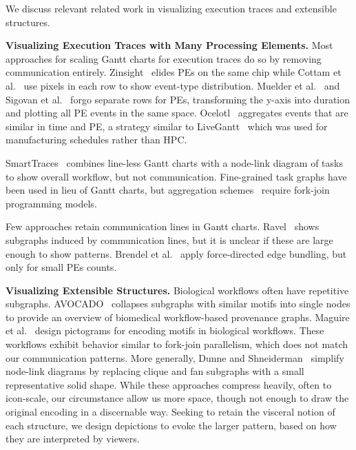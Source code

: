 We discuss relevant related work in visualizing execution traces and extensible structures.

\vspace{1ex}

\textbf{Visualizing Execution Traces with Many Processing Elements.} Most approaches for scaling Gantt charts for execution traces do so by removing communication entirely. Zinsight~\cite{Zinsight} elides PEs on the same chip while Cottam et al.~\cite{Cottam2015} use pixels in each row to show event-type distribution. Muelder et al.~\cite{Muelder2009} and Sigovan et al.~\cite{Sigovan2013} forgo separate rows for PEs, transforming the y-axis into duration and plotting all PE events in the same space. Ocelotl~\cite{Dosimont2014Ocelotlb} aggregates events that are similar in time and PE, a strategy similar to LiveGantt~\cite{Jo2014} which was used for manufacturing schedules rather than HPC.

SmartTraces~\cite{Osmari2014SmartTraces} combines line-less Gantt charts with a node-link diagram of tasks to show overall workflow, but not communication. Fine-grained task graphs have been used in lieu of Gantt charts, but aggregation schemes~\cite{Huynh2015DAGViz, Reissmann2017GrainGraphs} require fork-join programming models. 

Few approaches retain communication lines in Gantt charts. Ravel~\cite{isaacs2014combing} shows subgraphs induced by communication lines, but it is unclear if these are large enough to show patterns. Brendel et al.~\cite{Brendel2016} apply force-directed edge bundling, but only for small PEs counts.

\vspace{1ex}

\textbf{Visualizing Extensible Structures.} Biological workflows often have repetitive subgraphs. AVOCADO~\cite{Stitz2016} collapses subgraphs with similar motifs into single nodes to provide an overview of biomedical workflow-based provenance graphs. Maguire et al.~\cite{maguire2013visual} design pictograms for encoding motifs in biological workflows. These workflows exhibit behavior similar to fork-join parallelism, which does not match our communication patterns. More generally, Dunne and Shneiderman~\cite{Dunne2013Motifs} simplify node-link diagrams by replacing clique and fan subgraphs with a small representative solid shape. While these approaches compress heavily, often to icon-scale, our circumstance allow us more space, though not enough to draw the original encoding in a discernable way. Seeking to retain the visceral notion of each structure, we design depictions to evoke the larger pattern, based on how they are interpreted by viewers. 